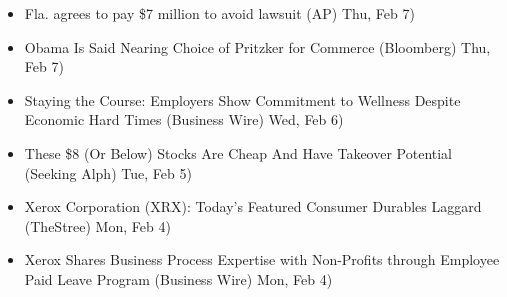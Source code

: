 \documentclass[11pt,asymmetric]{article}
\begin{document}
\begin{itemize}
\item Fla. agrees to pay \$7 million to avoid lawsuit (AP) Thu, Feb 7)
\item Obama Is Said Nearing Choice of Pritzker for Commerce (Bloomberg) Thu, Feb 7)
\item Staying the Course: Employers Show Commitment to Wellness Despite Economic Hard Times (Business Wire) Wed, Feb 6)
\item These \$8 (Or Below) Stocks Are Cheap And Have Takeover Potential (Seeking Alph) Tue, Feb 5)
\item Xerox Corporation (XRX): Today's Featured Consumer Durables Laggard (TheStree) Mon, Feb 4)
\item Xerox Shares Business Process Expertise with Non-Profits through Employee Paid Leave Program (Business Wire) Mon, Feb 4)
\end{itemize}
\end{document}
